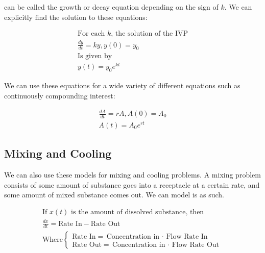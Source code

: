     can be called the growth or decay equation depending on the sign of $k$. We can explicitly find the solution to these equations:

    \begin{equation}\label{eq:growthdecay}
    \begin{aligned}
    \text{For each $k$, the solution of the IVP}\\
    \frac{dy}{dt} = ky, y(0) = y_0\\
    \text{Is given by}\\
    y(t) = y_0 e^{kt}
    \end{aligned}
    \end{equation}

    We can use these equations for a wide variety of different equations such as continuously compounding interest:

    \begin{equation}\label{eq:ccinterest}
    \begin{aligned}
    \frac{dA}{dt} = rA, A(0)=A_0\\
    A(t) = A_0 e^{rt}
    \end{aligned}
    \end{equation}

    \subsection{Mixing and Cooling}

    We can also use these models for mixing and cooling problems. A mixing problem consists of some amount of substance goes into a receptacle at a certain rate, and some amount of mixed substance comes out. We can model is as such.

    \begin{equation}\label{eq:mixcool}
    \begin{aligned}
    \text{If $x(t)$ is the amount of dissolved substance, then}\\
    \frac{dx}{dt} = \text{Rate In} - \text{Rate Out}\\
    \text{Where}
    \begin{cases}
    \text{Rate In} = \text{Concentration in $\cdot$ Flow Rate In}\\
    \text{Rate Out} = \text{Concentration in $\cdot$ Flow Rate Out}
    \end{cases}
    \end{aligned}
    \end{equation}

